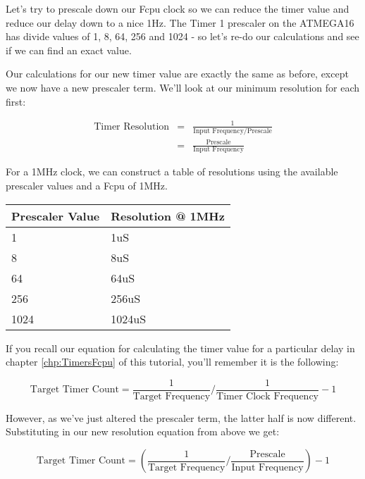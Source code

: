 \documentclass[a4paper,oneside,notitlepage]{book}
\begin{document}
Let's try to prescale down our Fcpu clock so we can reduce the timer value and reduce our delay down to a nice 1Hz. The Timer 1 prescaler on the ATMEGA16 has divide values of 1, 8, 64, 256 and 1024 - so let's re-do our calculations and see if we can find an exact value.

Our calculations for our new timer value are exactly the same as before, except we now have a new prescaler term. We'll look at our minimum resolution for each first:

\begin{displaymath}
\begin{array}{rcl}
	\text{Timer Resolution} & = & \frac{1}{\text{Input Frequency} / \text{Prescale}} \\[6pt]
	                        & = & \frac{\text{Prescale}}{\text{Input Frequency}}
\end{array}
\end{displaymath}

For a 1MHz clock, we can construct a table of resolutions using the available prescaler values and a Fcpu of 1MHz.

\begin{center}
\begin{tabular}{|l|l|}
	\hline
	Prescaler Value & Resolution @ 1MHz \\
	\hline
	1               & 1uS    \\
	8               & 8uS    \\
	64              & 64uS   \\
	256             & 256uS  \\
	1024            & 1024uS \\
	\hline
\end{tabular}
\end{center}

If you recall our equation for calculating the timer value for a particular delay in chapter \ref{chp:TimersFcpu} of this tutorial, you'll remember it is the following:

\begin{displaymath}
\text{Target Timer Count} = \frac{1}{\text{Target Frequency}} / \frac{1}{\text{Timer Clock Frequency}} - 1
\end{displaymath}

However, as we've just altered the prescaler term, the latter half is now different. Substituting in our new resolution equation from above we get:

\begin{displaymath}
\text{Target Timer Count} = (\frac{1}{\text{Target Frequency}} / \frac{\text{Prescale}}{\text{Input Frequency}}) - 1
\end{displaymath}
\end{document}
